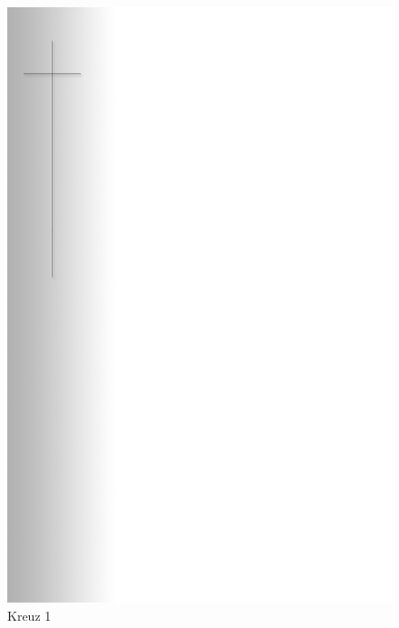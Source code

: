 \documentclass[ngerman,a4paper,11pt]{scrreprt}
\begin{document}
\begin{figure}[H]
\centering
\includegraphics[width=\textwidth,height=.8\textheight]{Bilder/Bilder/750_0010_12278_1032674_Kreuz.png}
\caption{Kreuz 1}
\end{figure}
\end{document}
